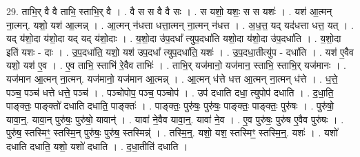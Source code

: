 \documentclass[17pt]{extarticle}
\begin{document}
29. ताभि॒र् वै वै ताभि॒ स्ताभि॒र् वै । . वै स स वै वै सः । . स यशो॒ यशः॒ स स यशः॑ । . यश॑ आ॒त्मन् ना॒त्मन्. यशो॒ यश॑ आ॒त्मन्न् । . आ॒त्मन् न॑धत्ता धत्ता॒त्मन् ना॒त्मन् न॑धत्त । . अ॒ध॒त्त॒ यद् यद॑धत्ता धत्त॒ यत् । . यद् य॑शो॒दा य॑शो॒दा यद् यद् य॑शो॒दाः । . य॒शो॒दा उ॑प॒दधा᳚ त्युप॒दधा॑ति यशो॒दा य॑शो॒दा उ॑प॒दधा॑ति । . य॒शो॒दा इति॑ यशः - दाः । . उ॒प॒दधा॑ति॒ यशो॒ यश॑ उप॒दधा᳚ त्युप॒दधा॑ति॒ यशः॑ । . उ॒प॒दधा॒तीत्यु॑प - दधा॑ति । . यश॑ ए॒वैव यशो॒ यश॑ ए॒व । . ए॒व ताभि॒ स्ताभि॑ रे॒वैव ताभिः॑ । . ताभि॒र् यज॑मानो॒ यज॑मान॒ स्ताभि॒ स्ताभि॒र् यज॑मानः । . यज॑मान आ॒त्मन् ना॒त्मन्. यज॑मानो॒ यज॑मान आ॒त्मन्न् । . आ॒त्मन् ध॑त्ते धत्त आ॒त्मन् ना॒त्मन् ध॑त्ते । . ध॒त्ते॒ पञ्च॒ पञ्च॑ धत्ते धत्ते॒ पञ्च॑ । . पञ्चोपोप॒ पञ्च॒ पञ्चोप॑ । . उप॑ दधाति दधा॒ त्युपोप॑ दधाति । . द॒धा॒ति॒ पाङ्क्तः॒ पाङ्क्तो॑ दधाति दधाति॒ पाङ्क्तः॑ । . पाङ्क्तः॒ पुरु॑षः॒ पुरु॑षः॒ पाङ्क्तः॒ पाङ्क्तः॒ पुरु॑षः । . पुरु॑षो॒ यावा॒न्॒. यावा॒न् पुरु॑षः॒ पुरु॑षो॒ यावान्॑ । . यावा॑ ने॒वैव यावा॒न्॒. यावा॑ ने॒व । . ए॒व पुरु॑षः॒ पुरु॑ष ए॒वैव पुरु॑षः । . पुरु॑ष॒ स्तस्मिꣳ॒॒ स्तस्मि॒न् पुरु॑षः॒ पुरु॑ष॒ स्तस्मिन्न्॑ । . तस्मि॒न्॒. यशो॒ यश॒ स्तस्मिꣳ॒॒ स्तस्मि॒न्॒. यशः॑ । . यशो॑ दधाति दधाति॒ यशो॒ यशो॑ दधाति । . द॒धा॒तीति॑ दधाति । \newline
\end{document}
